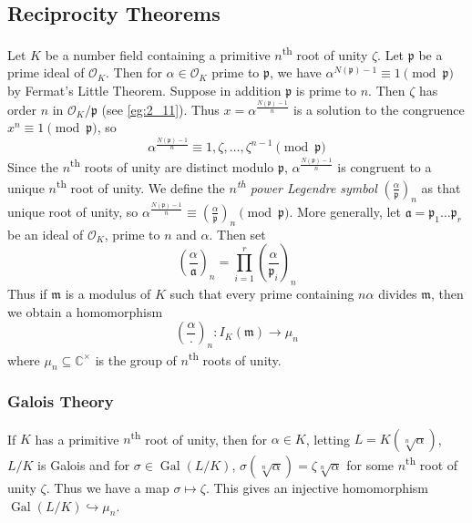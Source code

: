 \documentclass[11pt]{article}
\theoremstyle{definition}
\theoremstyle{plain}
\theoremstyle{remark}
\DeclareMathOperator{\Gal}{Gal}
\newcommand{\CC}{\mathbb{C}}
\newcommand{\cO}{\mathcal{O}}
\newcommand{\fa}{\mathfrak{a}}
\newcommand{\fp}{\mathfrak{p}}
\newcommand{\fm}{\mathfrak{m}}
\newcommand{\leg}[2]{\left(\frac{#1}{#2}\right)}
\begin{document}
\subsection{Reciprocity Theorems}

Let $K$ be a number field containing a primitive $n$\textsuperscript{th} root of unity $\zeta$. Let $\fp$ be a prime ideal of $\cO_K$. Then for $\alpha \in \cO_K$ prime to $\fp$, we have $\alpha^{N(\fp) - 1} \equiv 1 \pmod{\fp}$ by Fermat's Little Theorem. Suppose in addition $\fp$ is prime to $n$. Then $\zeta$ has order $n$ in $\cO_K / \fp$ (see \autoref{eg:2_11}). Thus $x = \alpha^{\frac{N(\fp)-1}{n}}$ is a solution to the congruence $x^n \equiv 1 \pmod{\fp}$, so
\begin{equation*}
    \alpha^{\frac{N(\fp)-1}{n}} \equiv 1, \zeta, \ldots, \zeta^{n-1} \pmod{\fp}
\end{equation*}
Since the $n$\textsuperscript{th} roots of unity are distinct modulo $\fp$, $\alpha^{\frac{N(\fp)-1}{n}}$ is congruent to a unique $n$\textsuperscript{th} root of unity. We define the \emph{$n$\textsuperscript{th} power Legendre symbol} $\leg{\alpha}{\fp}_n$ as that unique root of unity, so $\alpha^{\frac{N(\fp)-1}{n}} \equiv \leg{\alpha}{\fp}_n \pmod{\fp}$. More generally, let $\fa = \fp_1 \ldots \fp_r$ be an ideal of $\cO_K$, prime to $n$ and $\alpha$. Then set
\begin{equation*}
    \leg{\alpha}{\fa}_n = \prod_{i=1}^r \leg{\alpha}{\fp_i}_n
\end{equation*}
Thus if $\fm$ is a modulus of $K$ such that every prime containing $n\alpha$ divides $\fm$, then we obtain a homomorphism
\begin{equation*}
    \leg{\alpha}{\cdot}_n : I_K(\fm) \to \mu_n
\end{equation*}
where $\mu_n \subseteq \CC^\times$ is the group of $n$\textsuperscript{th} roots of unity.

\subsubsection*{Galois Theory}
If $K$ has a primitive $n$\textsuperscript{th} root of unity, then for $\alpha \in K$, letting $L = K(\sqrt[n]{\alpha})$, $L/K$ is Galois and for $\sigma \in \Gal(L/K)$, $\sigma(\sqrt[n]{\alpha}) = \zeta \sqrt[n]{\alpha}$ for some $n$\textsuperscript{th} root of unity $\zeta$. Thus we have a map $\sigma \mapsto \zeta$. This gives an injective homomorphism $\Gal(L/K) \hookrightarrow \mu_n$.
\end{document}
